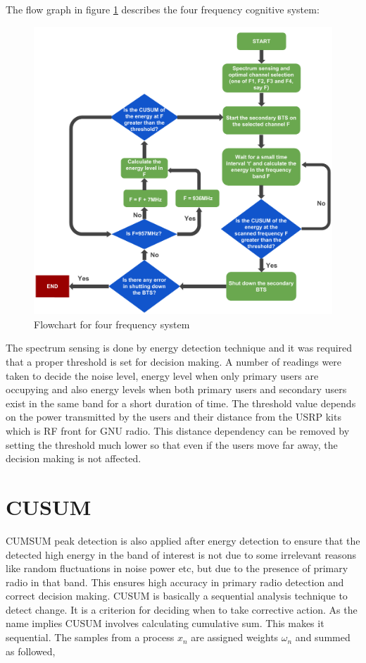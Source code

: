 The flow graph in figure \ref{freqSys4} describes the four frequency cognitive system:

\begin{figure}
\centering
\includegraphics[width=\textwidth]{../images/freqSys4}
\caption[Four frequency system]{Flowchart for four frequency system}
\label{freqSys4}
\end{figure}

The spectrum sensing is done by energy detection technique and it was required 
that a proper threshold is set for decision making. A number of readings were 
taken to decide the noise level, energy level when only primary users are 
occupying and also energy levels when both primary users and secondary users 
exist in the same band for a short duration of time. The threshold value 
depends on the power transmitted by the users and their distance from the USRP 
kits which is RF front for GNU radio. This distance dependency can be removed by 
setting the threshold much lower so that even if the users move 
far away, the decision making is not affected.  





\section{CUSUM}
CUMSUM peak detection is also applied after energy detection to ensure that the
detected high energy in the band of interest is not due to some irrelevant 
reasons like random fluctuations in noise power etc, but due to the presence of 
primary radio in that band. This ensures high accuracy in primary radio 
detection and correct decision making.
CUSUM is basically a sequential analysis technique to detect change. 
It is a criterion for deciding when to take corrective action. As the name 
implies CUSUM involves calculating cumulative sum. This makes it sequential. 
The samples from a process $x_n$  are assigned weights $\omega_n$  and summed 
as followed,

